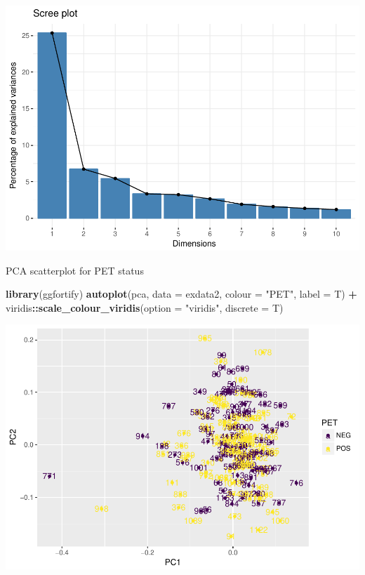 \documentclass[]{article}
\newenvironment{Shaded}{\begin{snugshade}}{\end{snugshade}}
\newcommand{\KeywordTok}[1]{\textcolor[rgb]{0.13,0.29,0.53}{\textbf{#1}}}
\newcommand{\DataTypeTok}[1]{\textcolor[rgb]{0.13,0.29,0.53}{#1}}
\newcommand{\StringTok}[1]{\textcolor[rgb]{0.31,0.60,0.02}{#1}}
\newcommand{\OperatorTok}[1]{\textcolor[rgb]{0.81,0.36,0.00}{\textbf{#1}}}
\newcommand{\NormalTok}[1]{#1}
\begin{document}
\includegraphics{20180125_summary_to_date_files/figure-latex/unnamed-chunk-67-1.pdf}

PCA scatterplot for PET status

\begin{Shaded}
\begin{Highlighting}[]
\KeywordTok{library}\NormalTok{(ggfortify)}
\KeywordTok{autoplot}\NormalTok{(pca, }\DataTypeTok{data =}\NormalTok{ exdata2, }\DataTypeTok{colour =} \StringTok{"PET"}\NormalTok{, }\DataTypeTok{label =}\NormalTok{ T) }\OperatorTok{+}
\StringTok{  }\NormalTok{viridis}\OperatorTok{::}\KeywordTok{scale_colour_viridis}\NormalTok{(}\DataTypeTok{option =} \StringTok{"viridis"}\NormalTok{, }\DataTypeTok{discrete =}\NormalTok{ T)}
\end{Highlighting}
\end{Shaded}

\includegraphics{20180125_summary_to_date_files/figure-latex/unnamed-chunk-68-1.pdf}
\end{document}

